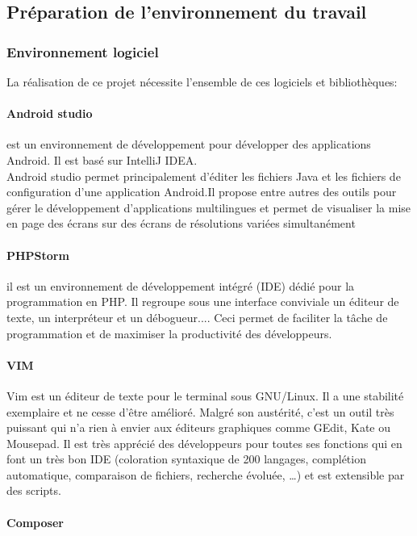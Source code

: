 \subsection{Préparation de l'environnement du travail}

\subsubsection{Environnement logiciel}

La réalisation de ce projet nécessite l'ensemble de ces logiciels et bibliothèques:

\paragraph{Android studio}
est un environnement
de développement pour développer des applications Android. Il est basé sur IntelliJ IDEA.\\
Android studio permet principalement d'éditer les fichiers Java et les fichiers 
de configuration d'une application 
Android.Il propose entre autres des outils pour gérer le développement d'applications multilingues 
et permet de visualiser la mise en page des écrans sur des écrans de résolutions variées simultanément

\paragraph{PHPStorm}
il est un environnement de développement intégré (IDE) dédié pour la
programmation en PHP. Il regroupe sous une interface conviviale un éditeur de texte, un
interpréteur et un débogueur.... Ceci permet de faciliter la tâche de programmation et de
maximiser la productivité des développeurs.
\paragraph{VIM}
Vim est un éditeur de texte pour le terminal sous GNU/Linux.
Il a une stabilité exemplaire et ne cesse d'être amélioré. Malgré son austérité, 
c'est un outil très puissant qui n'a rien à envier aux éditeurs graphiques comme GEdit, Kate ou Mousepad. 
Il est très apprécié des développeurs pour toutes ses fonctions qui en font un très bon IDE
(coloration syntaxique de 200 langages, complétion automatique, comparaison de fichiers, recherche évoluée, …) 
et est extensible par des scripts. 
\paragraph{Composer}

